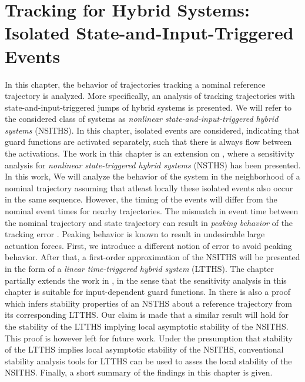\documentclass[../DC2017114Bouma.tex]{subfiles}
\begin{document}
\graphicspath{{03_Contribution/img/}}
\renewcommand{\chaptermark}[1]{\markboth{\thechapter.\ #1}{}}
\renewcommand{\sectionmark}[1]{\markright{#1}{}}

\pagestyle{fancyreport}
\cleartooddpage
\pagestyle{fancyreport}
\chapter{Tracking for Hybrid Systems: Isolated State-and-Input-Triggered Events}\label{ch:order}
In this chapter, the behavior of trajectories tracking a nominal reference trajectory is analyzed. More specifically, an analysis of tracking trajectories with state-and-input-triggered jumps of hybrid systems is presented. We will refer to the considered class of systems as \textit{nonlinear state-and-input-triggered hybrid systems} (NSITHS). In this chapter, isolated events are considered, indicating that guard functions are activated separately, such that there is always flow between the activations. The work in this chapter is an extension on \cite{Saccon2014,Rijnen2017}, where a sensitivity analysis for \textit{nonlinear state-triggered hybrid systems} (NSTHS) has been presented. In this work, We will analyze the behavior of the system in the neighborhood of a nominal trajectory assuming that atleast locally these isolated events also occur in the same sequence. However, the timing of the events will differ from the nominal event times for nearby trajectories. The mismatch in event time between the nominal trajectory and state trajectory can result in \textit{peaking behavior} of the tracking error \cite{Menini2001,Biemond2013}. Peaking behavior is known to result in undesirable large actuation forces. First, we introduce a different notion of error to avoid peaking behavior. After that, a first-order approximation of the NSITHS will be presented in the form of a \textit{linear time-triggered hybrid system} (LTTHS). The chapter partially extends the work in \cite{Rijnen2017}, in the sense that the sensitivity analysis in this chapter is suitable for input-dependent guard functions. In \cite{Rijnen2017} there is also a proof which infers stability properties of an NSTHS about a reference trajectory from its corresponding LTTHS. Our claim is made that a similar result will hold for the stability of the LTTHS implying local asymptotic stability of the NSITHS. This proof is however left for future work. Under the presumption that stability of the LTTHS implies local asymptotic stability of the NSITHS, conventional stability analysis tools for LTTHS can be used to asses the local stability of the NSITHS. Finally, a short summary of the findings in this chapter is given.
%
%
\end{document}
